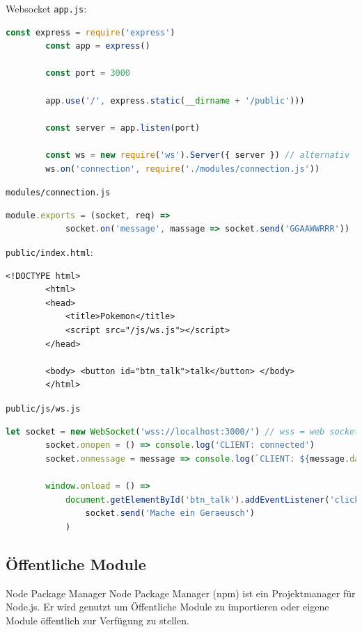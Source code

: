 \begin{example}{Websocket}
    \texttt{app.js}:
    \begin{lstlisting}[language=JavaScript]
        const express = require('express')
        const app = express()

        const port = 3000

        app.use('/', express.static(__dirname + '/public')))

        const server = app.listen(port)

        const ws = new require('ws').Server({ server }) // alternativ 'noServer: true'
        ws.on('connection', require('./modules/connection.js'))
    \end{lstlisting}

    \texttt{modules/connection.js}
    \begin{lstlisting}[language=JavaScript]
        module.exports = (socket, req) =>
            socket.on('message', massage => socket.send('GGAAWWRRR'))
    \end{lstlisting}

    \texttt{public/index.html}:
    \begin{lstlisting}[language=HTML5]
        <!DOCTYPE html>
        <html>
        <head>
            <title>Pokemon</title>
            <script src="/js/ws.js"></script>
        </head>

        <body> <button id="btn_talk">talk</button> </body>
        </html>
    \end{lstlisting}

    \texttt{public/js/ws.js}
    \begin{lstlisting}[language=JavaScript]
        let socket = new WebSocket('wss://localhost:3000/') // wss = web socket ^secure^
        socket.onopen = () => console.log('CLIENT: connected')
        socket.onmessage = message => console.log(`CLIENT: ${message.data}`)

        window.onload = () =>
            document.getElementById('btn_talk').addEventListener('click', event =>
                socket.send('Mache ein Geraeusch')
            )
    \end{lstlisting}
\end{example}

\subsection{Öffentliche Module}

\begin{defi}{Node Package Manager}
    Node Package Manager (npm) ist ein Projektmanager für Node.js.
    Er wird genutzt um Öffentliche Module zu importieren oder eigene Module öffentlich zur Verfügung zu stellen.
\end{defi}

